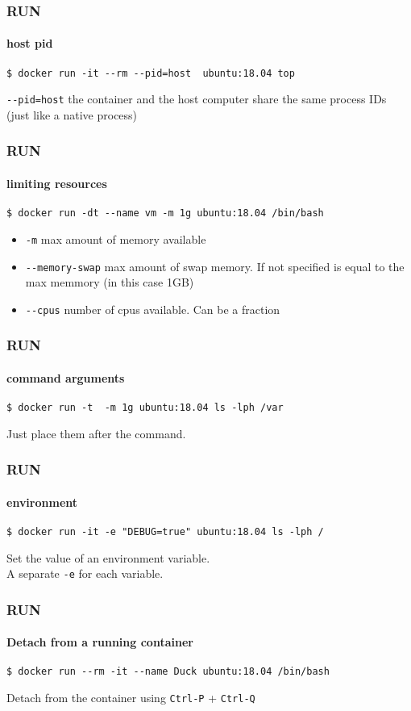 \begin{frame}[fragile]
\frametitle{RUN}
\framesubtitle{host pid}
\begin{lstlisting}
$ docker run -it --rm --pid=host  ubuntu:18.04 top
\end{lstlisting}
\lstinline!--pid=host! the container and the host computer share the same process IDs (just like a native process)
\end{frame}

\begin{frame}[fragile]
\frametitle{RUN}
\framesubtitle{limiting resources}
\begin{lstlisting}
$ docker run -dt --name vm -m 1g ubuntu:18.04 /bin/bash
\end{lstlisting}
\begin{itemize}
\item \lstinline!-m! max amount of memory available
\item \lstinline!--memory-swap! max amount of swap memory. If not specified is equal to the max memmory (in this case 1GB)
\item \lstinline!--cpus! number of cpus available. Can be a fraction
\end{itemize}
\end{frame}

\begin{frame}[fragile]
\frametitle{RUN}
\framesubtitle{command arguments}
\begin{lstlisting}
$ docker run -t  -m 1g ubuntu:18.04 ls -lph /var
\end{lstlisting}
Just place them after the command.
\end{frame}

\begin{frame}[fragile]
\frametitle{RUN}
\framesubtitle{environment}
\begin{lstlisting}
$ docker run -it -e "DEBUG=true" ubuntu:18.04 ls -lph /
\end{lstlisting}
Set the value of an environment variable.\\
\vspace{0.4cm}
A separate \lstinline!-e! for each variable.
\end{frame}

\begin{frame}[fragile]
\frametitle{RUN}
\framesubtitle{Detach from a running container}
\begin{lstlisting}
$ docker run --rm -it --name Duck ubuntu:18.04 /bin/bash
\end{lstlisting}
Detach from the container using \lstinline!Ctrl-P! + \lstinline!Ctrl-Q!
\end{frame}

